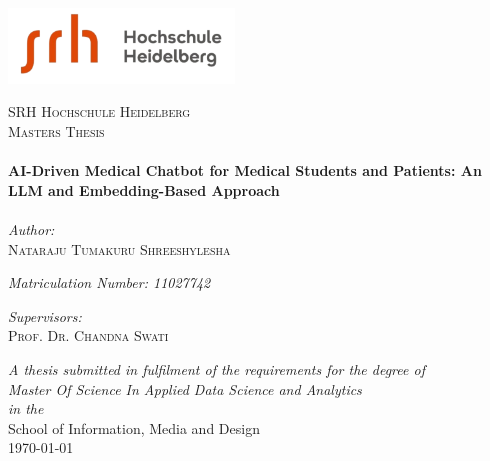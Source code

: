 \documentclass[12pt, oneside]{Thesis}
\def\ttitle{AI-Driven Medical Chatbot for Medical Students and Patients: An LLM and Embedding-Based Approach}
\def\authornames{Nataraju Tumakuru Shreeshylesha}
\def\supname{Prof. Dr. Chandna Swati}
\def\degreename{Master Of Science In Applied Data Science and Analytics}
\def\univname{SRH Hochschule Heidelberg}
\def\deptname{School of Information, Media and Design}
\begin{document}
\begin{titlepage}
    \begin{center}
      \includegraphics[width=6cm]{./Images/SRHLogo.png} %

        \textsc{\LARGE \univname}\\[1.5cm] %
        \textsc{\Large Masters Thesis}\\[0.5cm] %

        \HRule \\[0.4cm] %
        {\huge \bfseries \ttitle}\\[0.4cm] %
        \HRule \\[1.5cm] %
        \large
        \emph{Author:}\\[0.2cm]
        \textsc{\authornames} %

        \emph{Matriculation Number: 11027742} 

        \large
        \emph{Supervisors:} \\[0.2cm]
        \textsc{\supname} %

      
        \large \textit{A thesis submitted in fulfilment of the requirements for the degree of \\\degreename}\\[0.3cm] %
        \textit{in the}\\[0.4cm]

        \deptname\\[1.5cm] %
        {\large \mydateformat\today}\\[1cm]  %
        

        \vfill
    \end{center}
  \end{titlepage}
\end{document}
